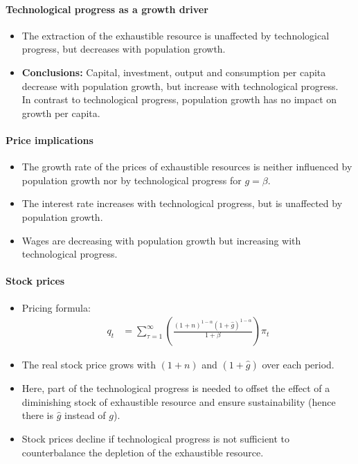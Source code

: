 \documentclass[a4paper,landscape,7pt,fleqn]{scrartcl}
\renewcommand{\emph}[1]{\textbf{#1}}
\begin{document}
\begin{multicols*}{3}
\paragraph{Technological progress as a growth driver}

\begin{itemize}
\item The extraction of the exhaustible resource is unaffected by technological progress, but decreases with population growth.
\item \emph{Conclusions:} Capital, investment, output and consumption per capita decrease with population growth, but increase with technological progress. \\
In contrast to technological progress, population growth has no impact on growth per capita.
\end{itemize}

\paragraph{Price implications}

\begin{itemize}
\item The growth rate of the prices of exhaustible resources is neither influenced by population growth nor by technological progress for $g = \beta$.
\item The interest rate increases with technological progress, but is unaffected by population growth.
\item Wages are decreasing with population growth but increasing with technological progress.
\end{itemize}

\paragraph{Stock prices}

\begin{itemize}
\item Pricing formula:
\begin{align*}
q_t &= \sum_{\tau=1}^\infty \left( \frac{(1+n)^{1-\alpha} (1+\hat g)^{1-\alpha}}{1+\beta} \right) \pi_t
\end{align*}
\item The real stock price grows with $(1+n)$ and $(1+\hat g)$ over each period.
\item Here, part of the technological progress is needed to offset the effect of a diminishing stock of exhaustible resource and ensure sustainability (hence there is $\hat g$ instead of $g$).
\item Stock prices decline if technological progress is not sufficient to counterbalance the depletion of the exhaustible resource.
\end{itemize}


\end{multicols*}
\end{document}
